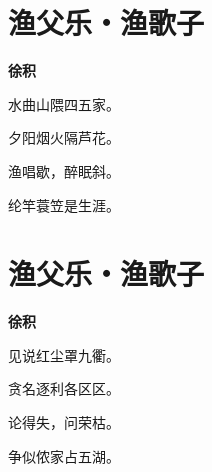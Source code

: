 \documentclass[12pt,a4paper]{ctexbook}
\begin{document}
\section{渔父乐・渔歌子}
\textbf{徐积}\par\vspace{0.5em}
水曲山隈四五家。\par
夕阳烟火隔芦花。\par
渔唱歇，醉眠斜。\par
纶竿蓑笠是生涯。\par

\section{渔父乐・渔歌子}
\textbf{徐积}\par\vspace{0.5em}
见说红尘罩九衢。\par
贪名逐利各区区。\par
论得失，问荣枯。\par
争似侬家占五湖。\par
\end{document}
